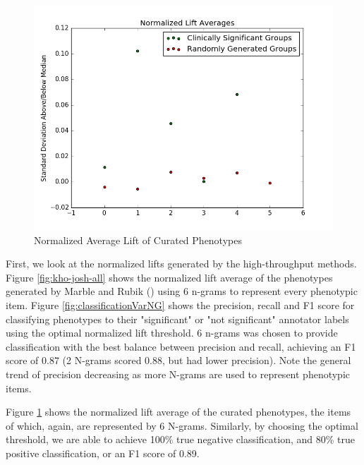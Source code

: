 \documentclass{sig-alternate-05-2015}
\begin{document}
\begin{figure} [t]
\centering
\includegraphics[width=\linewidth] {normalizedLiftAvg_labeled_Ordered.png}
\caption{Normalized Average Lift of Curated Phenotypes}
\label{fig:curatedPhenos}
\end{figure}


First, we look at the normalized lifts generated by the high-throughput methods. Figure \ref{fig:kho-josh-all} shows the normalized lift average of the phenotypes generated by Marble and Rubik (\cite {Ho:2014jc,Ho:2014da, wang2015rubik}) using 6 n-grams to represent every phenotypic item. Figure \ref{fig:classificationVarNG} shows the precision, recall and F1 score for classifying phenotypes to their "significant" or "not significant" annotator labels using the optimal normalized lift threshold. 6 n-grams was chosen to provide classification with the best balance between precision and recall, achieving an F1 score of 0.87 (2 N-grams scored 0.88, but had lower precision). Note the general trend of precision decreasing as more N-grams are used to represent phenotypic items.

Figure \ref{fig:curatedPhenos} shows the normalized lift average of the curated phenotypes, the items of which, again, are represented by 6 N-grams. Similarly, by choosing the optimal threshold, we are able to achieve 100\% true negative classification, and 80\% true positive classification, or an F1 score of 0.89.
\end{document}
